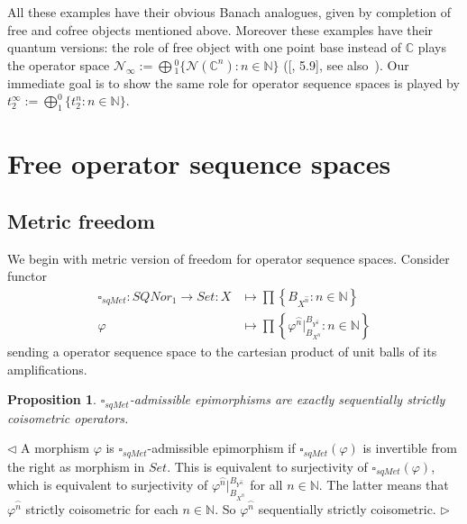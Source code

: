 \documentclass[12pt]{article}
\newtheorem{proposition}[theorem]{Proposition}
\newenvironment{proof}{\par $\triangleleft$}{$\triangleright$}
\begin{document}
All these examples have their obvious Banach analogues, given by completion of 
free and cofree objects mentioned above. Moreover these examples have their 
quantum versions: the role of free object with one point base instead 
of $\mathbb{C}$ plays the operator space 
$\mathcal{N}_{\infty}
:=\bigoplus{}_1^0 \{\mathcal{N}(\mathbb{C}^n):n\in\mathbb{N} \}$
([\cite{HelMetrFrQmod}, 5.9], 
see also~\cite{ShtTopFr}). Our immediate goal is to show the same role for 
operator sequence spaces is played by 
$t_2^{\infty} :=  \bigoplus_1^0 \{t_2^n:n\in\mathbb{N} \}$.  






































\section{Free operator sequence spaces}

\subsection{Metric freedom}

We begin with metric version of freedom for operator sequence spaces. 
Consider functor
$$
\begin{aligned}
\square_{sqMet}
:SQNor_1 \to Set
:X&\mapsto\prod\left \{B_{X^{\wideparen{n}}}:n \in \mathbb{N}\right \} \\
\varphi&\mapsto
\prod\left \{
    \varphi^{\wideparen{n}}|_{B_{X^{\wideparen{n}}}}^{B_{Y^{\wideparen{n}}}}
    :n\in\mathbb{N}
\right \}
\end{aligned}
$$
sending a operator sequence space to the cartesian product of unit balls of 
its amplifications. 

\begin{proposition}\label{PrDecsMetrAdmEpiMorph}
$\square_{sqMet}$-admissible epimorphisms are exactly sequentially strictly 
coisometric operators.
\end{proposition}
\begin{proof}
A morphism $\varphi$ is $\square_{sqMet}$-admissible epimorphism 
if $\square_{sqMet}(\varphi)$ is invertible from the right as morphism in $Set$. 
This is equivalent to surjectivity of $\square_{sqMet}(\varphi)$, which is 
equivalent to surjectivity of 
$\varphi^{\wideparen{n}}|_{B_{X^{\wideparen{n}}}}^{B_{Y^{\wideparen{n}}}}$ 
for all $n\in\mathbb{N}$. The latter means that $\varphi^{\wideparen{n}}$ 
strictly coisometric for each $n\in\mathbb{N}$. 
So $\varphi^{\wideparen{n}}$ sequentially strictly coisometric.
\end{proof}
\end{document}
